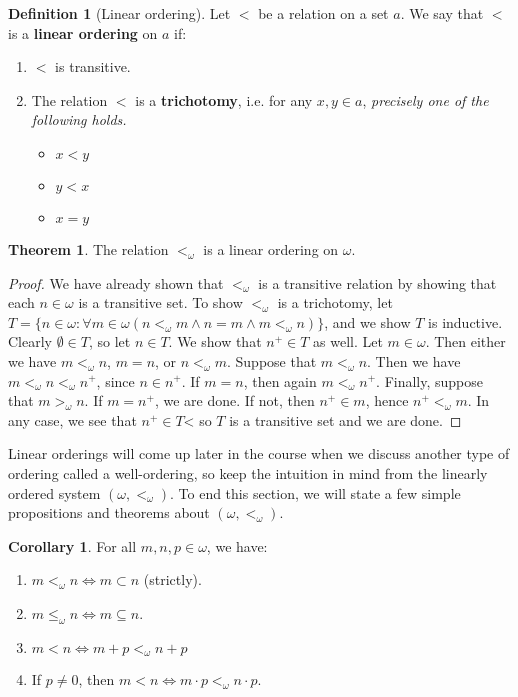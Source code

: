 \documentclass[11pt, oneside]{article}   	%
\theoremstyle{definition}
\newtheorem{definition}{Definition}[section]
\newtheorem{theorem}{Theorem}[section]
\newtheorem{corollary}{Corollary}[theorem]
\begin{document}
\begin{definition}[Linear ordering]
	Let $<$ be a relation on a set $a$. We say that $<$ is a \textbf{linear ordering} on $a$ if:
	\begin{enumerate}
		\item $<$ is transitive.
		\item The relation $<$ is a \textbf{trichotomy}, i.e. for any $x, y\in a$, \textit{precisely one of the following holds.}
			\begin{itemize}[-]
				\item $x < y$
				\item $y < x$
				\item $x = y$
			\end{itemize}
	\end{enumerate}
\end{definition}

\begin{theorem}
	The relation $<_\omega$ is a linear ordering on $\omega$.
\end{theorem}

\begin{proof}
	We have already shown that $<_\omega$ is a transitive relation by showing that each $n\in\omega$ is a transitive set. 
	To show $<_\omega$ is a trichotomy, let $T = \{n\in\omega : \forall m\in\omega (n <_\omega m\wedge n = m\wedge 
	m <_\omega n)\}$, and we show $T$ is inductive. Clearly $\emptyset\in T$, so let $n\in T$. We show that $n^+\in T$ 
	as well. Let $m\in\omega$. Then either we have $m <_\omega n$, $m = n$, or $n <_\omega m$. Suppose that 
	$m <_\omega n$. Then we have $m <_\omega n <_\omega n^+$, since $n\in n^+$. If $m = n$, then again $m <_\omega
	n^+$. Finally, suppose that $m >_\omega n$. If $m = n^+$, we are done. If not, then $n^+\in m$, hence $n^+ <_\omega 
	m$. In any case, we see that $n^+\in T$< so $T$ is a transitive set and we are done.
\end{proof}

Linear orderings will come up later in the course when we discuss another type of ordering called a well-ordering, so keep the 
intuition in mind from the linearly ordered system $(\omega, <_\omega)$. To end this section, we will state a few simple 
propositions and theorems about $(\omega, <_\omega)$. 

\begin{corollary}
	For all $m, n, p\in\omega$, we have:
	\begin{enumerate}
		\item $m <_\omega n\iff m\subset n$ (strictly).
		\item $m\leq_\omega n\iff m\subseteq n$.
		\item $m < n\iff m + p <_\omega n + p$
		\item If $p\neq 0$, then $m < n\iff m\cdot p <_\omega n\cdot p$. 
	\end{enumerate}
\end{corollary}
\end{document}
